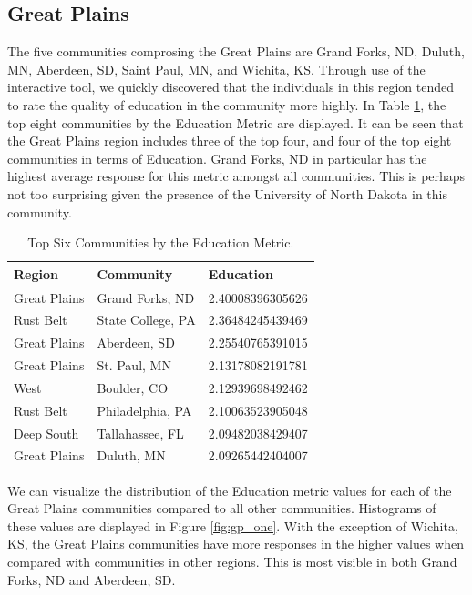 \documentclass[11pt]{article}\usepackage{knitr}
\begin{document}
\subsection*{Great Plains}
The five communities comprosing the Great Plains are Grand Forks, ND, Duluth, MN, Aberdeen, SD, Saint Paul, MN, and Wichita, KS. Through use of the interactive tool, we quickly discovered that the individuals in this region tended to rate the quality of education in the community more highly. In Table \ref{tbl:edu_table}, the top eight communities by the Education Metric are displayed. It can be seen that the Great Plains region includes three of the top four, and four of the top eight communities in terms of Education. Grand Forks, ND in particular has the highest average response for this metric amongst all communities. This is perhaps not too surprising given the presence of the University of North Dakota in this community.

\begin{table}[ht]
\centering
\begin{tabular}{lll}
  \hline
Region & Community & Education \\ 
  \hline
Great Plains & Grand Forks, ND & 2.40008396305626 \\ 
  Rust Belt & State College, PA & 2.36484245439469 \\ 
  Great Plains & Aberdeen, SD & 2.25540765391015 \\ 
  Great Plains & St. Paul, MN & 2.13178082191781 \\ 
  West & Boulder, CO & 2.12939698492462 \\ 
  Rust Belt & Philadelphia, PA & 2.10063523905048 \\ 
  Deep South & Tallahassee, FL & 2.09482038429407 \\ 
  Great Plains & Duluth, MN & 2.09265442404007 \\ 
   \hline
\end{tabular}
\caption{Top Six Communities by the Education Metric.} 
\label{tbl:edu_table}
\end{table}



We can visualize the distribution of the Education metric values for each of the Great Plains communities compared to all other communities. Histograms of these values are displayed in Figure \ref{fig:gp_one}. With the exception of Wichita, KS, the Great Plains communities have more responses in the higher values when compared with communities in other regions. This is most visible in both Grand Forks, ND and Aberdeen, SD.
\end{document}
